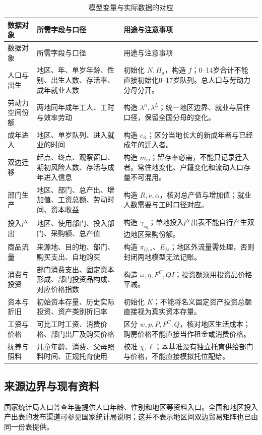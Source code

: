 \documentclass[UTF8,a4paper,zihao=-4,fontset=windows]{ctexart}
\numberwithin{equation}{section}
\newcommand{\pc}{P^{C}}
\begin{document}
{\small
\begin{longtable}{p{}p{}p{}}
\caption{模型变量与实际数据的对应}\label{tab:data}\\
\toprule
数据对象 & 所需字段与口径 & 用途与注意事项\\
\midrule\endfirsthead
\toprule 数据对象 & 所需字段与口径 & 用途与注意事项\\\midrule\endhead
\bottomrule\endfoot
人口与出生 & 地区、年、单岁年龄、性别、出生人数、存活率、成年就业人数 & 初始化 $N,H_a$，构造 $f$；0--14岁合计不能直接初始化0--17岁队列。总人口与劳动力分母分开。\\
劳动力空间份额 & 两地同年成年工人、工时与效率劳动 & 构造 $\lambda^n,\lambda^L$；统一地区边界、就业与居住口径，保留全国分母的变化。\\
成年进入 & 地区、单岁队列、进入就业的时间 & 构造 $e_{it}$；区分当地长大的新成年者与已经成年的迁入者。\\
双边迁移 & 起点、终点、观察窗口、期初风险人数、存活与成年进入信息 & 构造 $m_{ij}$；留存率必需，不能只记录迁入者。常住地变化、户籍变化和流动人口存量不可混用。\\
部门生产 & 地区、部门、总产出、增加值、工资总额、劳动时间、资本收益 & 构造 $R,\nu,\alpha$，核对总产值与增加值；就业人数需要与工时口径对应。\\
投入产出 & 地区、使用部门、投入部门、采购额、总产值 & 构造 $\gamma_{sq}$；单地投入产出表不能自行产生双边地区采购份额。\\
商品流量 & 来源地、目的地、部门、购买支出、自地购买 & 构造 $\pi_{ij,s}$、$E_{js}$；地区外流量需处理，否则封闭两地模型无法记账。\\
消费与投资 & 部门消费支出、固定资本形成、部门投资品构成、对应价格指数 & 构造 $\omega,\eta,F^C,QI$；投资额须用投资品价格平减。\\
资本与折旧 & 初始资本存量、历史实际投资、资产类别折旧率 & 初始化 $K$；不能将名义固定资产投资总额直接视为真实资本存量。\\
工资与价格 & 可比工时工资、消费价格、部门出厂及购买价格 & 区分 $w,p,P,\pc,Q$，核对地区生活成本；购房价格不能直接当作租金或消费价格。\\
抚养与照料 & 儿童年龄、消费、父母照料时间、正规托育使用 & 校准 $\chi,\ell$；本基准没有独立托育供给部门与价格，不能直接模拟托位配给。\\
\end{longtable}}

\subsection{来源边界与现有资料}
国家统计局人口普查年鉴提供人口年龄、性别和地区等资料入口\citep{nbs2020census}。全国和地区投入产出表的发布渠道可参见国家统计局说明\citep{nbs2024io}；这并不表示地区间双边贸易矩阵也已由同一份表提供。
\end{document}
